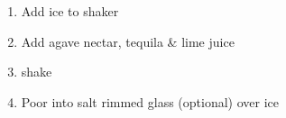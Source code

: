 \documentclass[letter]{recipe}
\begin{document}

\begin{enumerate}
\addtolength{\itemindent}{2em}
 \item Add ice to shaker
%
 \item Add agave nectar, tequila \& lime juice
%
 \item shake
%
 \item Poor into salt rimmed glass (optional) over ice
\end{enumerate}
\end{document}
